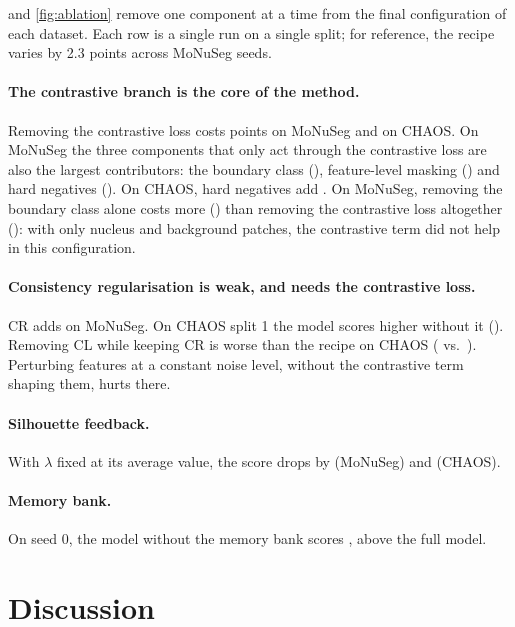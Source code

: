 \documentclass[11pt]{article}
\begin{document}
 and \cref{fig:ablation} remove one component at a time from the final configuration of each dataset. Each row is a single run on a single split; for reference, the recipe varies by 2.3 points across MoNuSeg seeds.

\paragraph{The contrastive branch is the core of the method.} Removing the contrastive loss costs \nMDNoCLAbs{} points on MoNuSeg and \nCDNoCLAbs{} on CHAOS. On MoNuSeg the three components that only act through the contrastive loss are also the largest contributors: the boundary class (\nMDNoBnd), feature-level masking (\nMDNoFeat) and hard negatives (\nMDNoHNM). On CHAOS, hard negatives add \nCDNoHNMAbs. On MoNuSeg, removing the boundary class alone costs more (\nMDNoBndAbs) than removing the contrastive loss altogether (\nMDNoCLAbs): with only nucleus and background patches, the contrastive term did not help in this configuration.

\paragraph{Consistency regularisation is weak, and needs the contrastive loss.} CR adds \nMDNoCRAbs{} on MoNuSeg. On CHAOS split 1 the model scores higher without it (\nCDNoCR). Removing CL while keeping CR is worse than the recipe on CHAOS (\nCANoCL{} vs.\ \nCARec). Perturbing features at a constant noise level, without the contrastive term shaping them, hurts there.

\paragraph{Silhouette feedback.} With $\lambda$ fixed at its average value, the score drops by \nMDNoSilAbs{} (MoNuSeg) and \nCDNoSilAbs{} (CHAOS).

\paragraph{Memory bank.} On seed 0, the model without the memory bank scores \nMANoMem, \nMDNoMemAbs{} above the full model.


\section{Discussion}
\label{sec:discussion}
\end{document}
